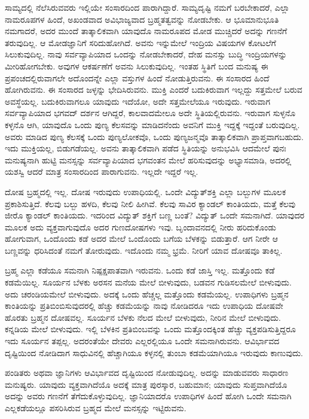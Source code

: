 ಸಾಮ್ಯದಲ್ಲಿ ನೆಲೆಸಿರುವವರು ಇಲ್ಲಿಯೇ ಸಂಸಾರದಿಂದ ಪಾರಾಗಿದ್ದಾರೆ. ಸಾಮ್ಯದೃಷ್ಟಿ ನಮಗೆ ಬರಬೇಕಾದರೆ, ಎಲ್ಲಾ ನಾಮರೂಪಗಳ ಹಿಂದೆ, ಅಖಂಡವಾದ ಅವಿಭಾಜ್ಯವಾದ ಬ್ರಹ್ಮತತ್ವವನ್ನು ನೋಡಬೇಕು. ಆ ಭೂಮಾನುಭೂತಿ ನಮಗಾದರೆ, ಅದರ ಮುಂದೆ ತಾತ್ಕಾಲಿಕವಾಗಿ ಯಾವುದೊ ನಾಮರೂಪದ ಮೋಡ ಮುಚ್ಚಿದರೆ ಅದನ್ನು ಗಣನೆಗೆ ತರುವುದಿಲ್ಲ. ಆ ಮೋಡ\break ಜ್ಞಾನಿಗೆ ಸರಿದುಹೋಗಿದೆ. ಅವನು ಇನ್ನುಮೇಲೆ ಇಂದ್ರಿಯ ವಿಷಯಗಳ ಕೋಟಲೆಗೆ ಸಿಲುಕುವುದಿಲ್ಲ. ನಾವು ಸರ್ವವ್ಯಾಪಿಯಾದ ಒಂದನ್ನು ನೋಡಬೇಕಾದರೆ, ದೇಹ ಮನಸ್ಸು ಬುದ್ಧಿ ಇಂದ್ರಿಯಗಳನ್ನು ಮೀರಿಹೋಗಬೇಕು. ಅವುಗಳ ಆಕರ್ಷಣೆಗೆ ಅವನು ಸಿಲುಕುವುದಿಲ್ಲ. ಇಂತಹ ಸ್ಥಿತಿಗೆ ಬಂದ ಮನುಷ್ಯ ಈ ಪ್ರಪಂಚದಲ್ಲಿರುವಾಗಲೇ ಅದೊಂದನ್ನೇ ಎಲ್ಲಾ ವಸ್ತುಗಳ ಹಿಂದೆ ನೋಡುತ್ತಿರುವನು. ಈ ಸಂಸಾರದ ಹಿಂದೆ ಹೋಗಿರುವನು. ಈ ಸಂಸಾರದ ಜಳ್ಳನ್ನು ಭೇದಿಸಿರು\-ವನು. ಮುಕ್ತಿ ಎಂದರೆ ಬದುಕಿರುವಾಗ ಇಲ್ಲದ್ದು ಸತ್ತಮೇಲೆ ಬರುವ ಅವಸ್ಥೆಯಲ್ಲ. ಬದುಕಿರು\-ವಾಗಲೂ ಯಾವುದು ಇದೆಯೋ, ಅದೇ ಸತ್ತಮೇಲೆಯೂ ಇರುವುದು. ಇರುವಾಗ ಸರ್ವವ್ಯಾಪಿಯಾದ ಭಗವದ್ ದರ್ಶನ ಆಗಿದ್ದರೆ, ಕಾಲವಾದಮೇಲೂ ಅದೇ ಸ್ಥಿತಿಯಲ್ಲಿರುವನು. ಇರುವಾಗ ಸುಳ್ಳನೊ ಕಳ್ಳನೊ ಆಗಿ, ಯಾವುದೊ ಒಂದು ಪುಣ್ಯ ಕೆಲಸವನ್ನು ಮಾಡಿದನೆಂದು ಅವನಿಗೆ ಮುಕ್ತಿ ಇದ್ದಕ್ಕೆ ಇದ್ದಂತೆ ಬರುವುದಿಲ್ಲ. ಅವರು ಮಾಡಿದ ಪುಣ್ಯ ಕೆಲಸಕ್ಕೆ ಒಂದು ಪುಣ್ಯಲೋಕವೊ, ಒಂದು ಪುಣ್ಯಜನ್ಮವೊ ತಾತ್ಕಾಲಿಕವಾಗಿ ಪ್ರಾಪ್ತವಾಗಬಹುದು. ಇದು ಮುಕ್ತಿಯಲ್ಲ, ಬಿಡುಗಡೆಯಲ್ಲ. ಅವನು ತಾತ್ಕಾಲಿಕವಾಗಿ ಪಡೆದ ಸ್ಥಿತಿಯನ್ನು ಅನುಭವಿಸಿ ಆದಮೇಲೆ ಪುನಃ ಮನುಷ್ಯನಾಗಿ ಹುಟ್ಟಿ ಮನಸ್ಸನ್ನು ಸರ್ವವ್ಯಾಪಿಯಾದ ಭಗವಂತನ ಮೇಲೆ ಹರಿಸುವುದನ್ನು ಅಭ್ಯಾಸಮಾಡಿ, ಅದರಲ್ಲಿ ಯಶಸ್ವಿ ಆದರೆ ಮಾತ್ರ ಸಂಸಾರದಿಂದ ಪಾರಾಗುವನು. ಇಲ್ಲದೇ ಇದ್ದರೆ ಇಲ್ಲ.

ದೋಷ ಬ್ರಹ್ಮದಲ್ಲಿ ಇಲ್ಲ. ದೋಷ ಇರುವುದು ಉಪಾಧಿಯಲ್ಲಿ. ಒಂದೇ ವಿದ್ಯುತ್​ಶಕ್ತಿ ಎಲ್ಲಾ ಬಲ್ಬುಗಳ ಮೂಲಕ ಪ್ರಕಾಶಿಸುತ್ತಿದೆ. ಕೆಲವು ಬಲ್ಬು ಹಳದಿ, ಕೆಲವು ನೀಲಿ ಹೀಗಿವೆ. ಕೆಲವು ಸಾವಿರ ಕ್ಯಾಂಡಲ್ ಕಾಂತಿಯದು, ಮತ್ತೆ ಕೆಲವು ಜೀರೊ ಕ್ಯಾಂಡಲ್ ಕಾಂತಿಯದು. ಇದರಿಂದ ವಿದ್ಯುತ್ ಶಕ್ತಿಗೆ ಬಣ್ಣ ಬಂತೆ? ವಿದ್ಯುತ್ ಒಂದೇ ಸಮನಾಗಿದೆ. ಯಾವುದರ ಮೂಲಕ ಅದು ವ್ಯಕ್ತವಾಗುವುದೊ ಅದರ ಗುಣದೋಷಗಳು ಇವು. ಬೃಂದಾವನದಲ್ಲಿ ನೀರು ಹರಿದುಕೊಂಡು ಹೋಗುವಾಗ, ಒಂದೊಂದು ಕಡೆ ಅದರ ಮೇಲೆ ಒಂದೊಂದು ಬಗೆಯ ಬೆಳಕನ್ನು ಬಿಡುತ್ತಾರೆ. ಆಗ ನೀರೇ ಆ ಬಣ್ಣವನ್ನು ಧರಿಸಿದಂತೆ ನಮಗೆ ತೋರುವುದು. ಇದೊಂದು ನಮ್ಮ ಭ್ರಮೆ. ನೀರಿಗೆ ಯಾವ ದೋಷವೂ ತಾಕಿಲ್ಲ.

ಬ್ರಹ್ಮ ಎಲ್ಲಾ ಕಡೆಯೂ ಸಮನಾಗಿ ನಿಷ್ಪಕ್ಷಪಾತವಾಗಿ ಇರುವನು. ಒಂದು ಕಡೆ ಜಾಸ್ತಿ ಇಲ್ಲ. ಮತ್ತೊಂದು ಕಡೆ ಕಡಮೆಯಿಲ್ಲ. ಸೂರ್ಯನ ಬೆಳಕು ಅರಸನ ಮನೆಯ ಮೇಲೆ ಬೀಳುವುದು, ಬಡವನ ಗುಡಿಸಲಮೇಲೆ ಬೀಳುವುದು. ಅದು ಚರಂಡಿಯಮೇಲೆ ಬೀಳುವುದು. ಅದಕ್ಕೆ ಒಂದು ಹೆಚ್ಚಲ್ಲ ಮತ್ತೊಂದು ಕಡಮೆಯಲ್ಲ. ಉಪಾಧಿಗಳು ಬ್ರಹ್ಮನ ಕಾಂತಿಯನ್ನು ಪ್ರತಿಬಿಂಬಿಸುವುದರಲ್ಲಿ ಹೆಚ್ಚು ಕಡಮೆಯನ್ನು ನಾವು ನೋಡಿದರೂ ಇದು ಉಪಾಧಿಯ ದೋಷವೇ ಹೊರತು ಬ್ರಹ್ಮನ ದೋಷವಲ್ಲ. ಸೂರ್ಯನ ಬೆಳಕು ನೆಲದ ಮೇಲೆ ಬೀಳುವುದು, ನೀರಿನ ಮೇಲೆ ಬೀಳುವುದು. ಕನ್ನಡಿಯ ಮೇಲೆ ಬೀಳುವುದು. ಇಲ್ಲಿ ಬೆಳಕಿನ ಪ್ರತಿಬಿಂಬವನ್ನು ಒಂದು ಮತ್ತೊಂದಕ್ಕಿಂತ ಹೆಚ್ಚು ವ್ಯಕ್ತಪಡಿಸುತ್ತಿದ್ದರೂ ಇದು ಸೂರ್ಯನ ತಪ್ಪಲ್ಲ. ಅದರಂತೆಯೇ ದೇವರು ಎಲ್ಲರಲ್ಲಿಯೂ ಒಂದೇ ಸಮನಾಗಿರುವನು. ಆವಿರ್ಭಾವದ ದೃಷ್ಟಿಯಿಂದ ನೋಡಿದಾಗ ಸಾಧುವಿನಲ್ಲಿ ಹೆಚ್ಚಾಗಿಯೂ ಕಳ್ಳನಲ್ಲಿ ತುಂಬಾ ಕಡಮೆಯಾಗಿಯೂ ಇರುವುದು ಕಾಣುವುದು.

ಪಂಡಿತರು ಅಥವಾ ಜ್ಞಾನಿಗಳು ಆವಿರ್ಭಾವದ ದೃಷ್ಟಿಯಿಂದ ನೋಡುವುದಿಲ್ಲ. ಅದನ್ನು ಮಾಡುವವರು ಸಾಧಾರಣ ಮನುಷ್ಯರು. ಯಾವುದು ವ್ಯಕ್ತವಾಗಿದೆಯೊ ಅದಕ್ಕೆ ಮಾತ್ರ ಪುರಸ್ಕಾರ, ಬಹುಮಾನ; ಯಾವುದು ಸುಪ್ತವಾಗಿದೆಯೊ ಅದನ್ನು ಅವರು ಗಣನೆಗೆ ತೆಗೆದುಕೊಳ್ಳುವುದಿಲ್ಲ. ಜ್ಞಾನಿಯಾದರೊ ಉಪಾಧಿಗಳ ಹಿಂದೆ ಹೋಗಿ ಒಂದೇ ಸಮನಾಗಿ ಎಲ್ಲಕಡೆಯಲ್ಲೂ ಪಸರಿಸಿರುವ ಬ್ರಹ್ಮದ ಮೇಲೆ ಮನಸ್ಸನ್ನು ಇಟ್ಟಿರುವನು.

